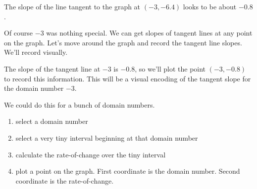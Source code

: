 \documentclass{ximera}
\begin{document}
\begin{center}
\end{center}




The slope of the line tangent to the graph at $(-3, -6.4)$ looks to be about $-0.8$.

Of course $-3$ was nothing special.  We can get slopes of tangent lines at any point on the graph. Let's move around the graph and record the tangent line slopes.  We'll record visually.

The slope of the tangent line at $-3$ is $-0.8$, so we'll plot the point $(-3,-0.8)$ to record this information.  This will be a visual encoding of the tangent slope for the domain number $-3$.





\begin{image}
\end{image}


We could do this for a bunch of domain numbers.

\begin{enumerate}
\item select a domain number
\item select a very tiny interval beginning at that domain number
\item calculate the rate-of-change over the tiny interval
\item plot a point on the graph.  First coordinate is the domain number.  Second coordinate is the rate-of-change.
\end{enumerate}
\end{document}
